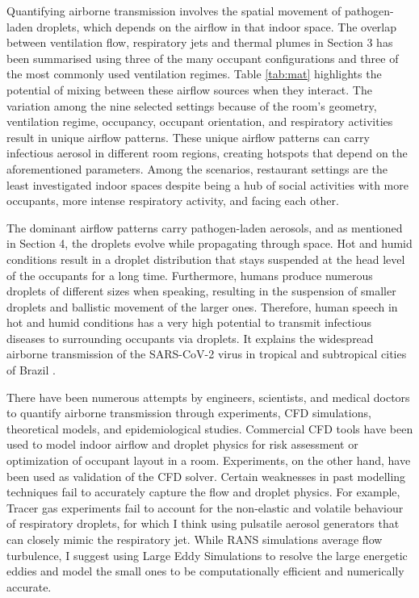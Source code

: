 \documentclass[preprint,12pt]{elsarticle}
\begin{document}
Quantifying airborne transmission involves the spatial movement of pathogen-laden droplets, which depends on the airflow in that indoor space. The overlap between ventilation flow, respiratory jets and thermal plumes in Section 3 has been summarised using three of the many occupant configurations and three of the most commonly used ventilation regimes. Table \ref{tab:mat} highlights the potential of mixing between these airflow sources when they interact. The variation among the nine selected settings because of the room's geometry, ventilation regime, occupancy, occupant orientation, and respiratory activities result in unique airflow patterns. These unique airflow patterns can carry infectious aerosol in different room regions, creating hotspots that depend on the aforementioned parameters. Among the scenarios, restaurant settings are the least investigated indoor spaces despite being a hub of social activities with more occupants, more intense respiratory activity, and facing each other.

The dominant airflow patterns carry pathogen-laden aerosols, and as mentioned in Section 4, the droplets evolve while propagating through space. Hot and humid conditions result in a droplet distribution that stays suspended at the head level of the occupants for a long time. Furthermore, humans produce numerous droplets of different sizes when speaking, resulting in the suspension of smaller droplets and ballistic movement of the larger ones. Therefore, human speech in hot and humid conditions has a very high potential to transmit infectious diseases to surrounding occupants via droplets. It explains the widespread airborne transmission of the SARS-CoV-2 virus in tropical and subtropical cities of Brazil \cite{prata2020temperature}. 

There have been numerous attempts by engineers, scientists, and medical doctors to quantify airborne transmission through experiments, CFD simulations, theoretical models, and epidemiological studies. Commercial CFD tools have been used to model indoor airflow and droplet physics for risk assessment or optimization of occupant layout in a room. Experiments, on the other hand, have been used as validation of the CFD solver. Certain weaknesses in past modelling techniques fail to accurately capture the flow and droplet physics. For example, Tracer gas experiments fail to account for the non-elastic and volatile behaviour of respiratory droplets, for which I think using pulsatile aerosol generators that can closely mimic the respiratory jet. While RANS simulations average flow turbulence, I suggest using Large Eddy Simulations to resolve the large energetic eddies and model the small ones to be computationally efficient and numerically accurate.
\end{document}
